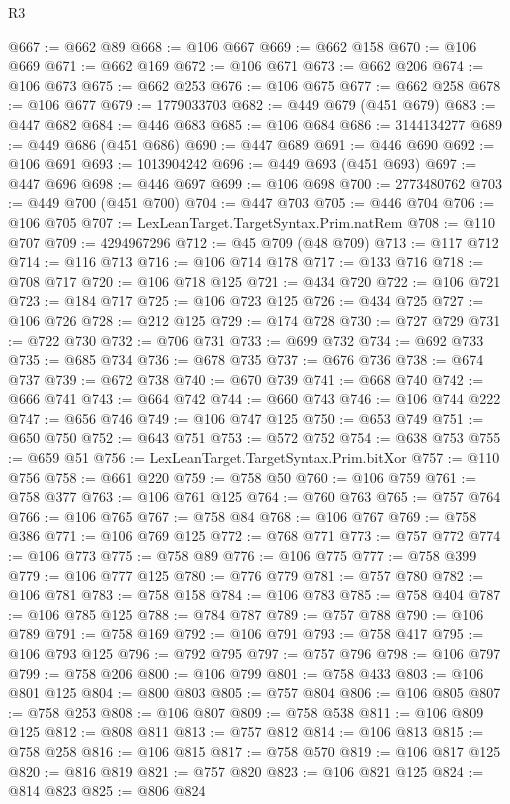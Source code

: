 \begin{lexlean}{R3}
\begin{coremodule}
@667 := @662 @89
@668 := @106 @667
@669 := @662 @158
@670 := @106 @669
@671 := @662 @169
@672 := @106 @671
@673 := @662 @206
@674 := @106 @673
@675 := @662 @253
@676 := @106 @675
@677 := @662 @258
@678 := @106 @677
@679 := 1779033703
@682 := @449 @679 (@451 @679)
@683 := @447 @682
@684 := @446 @683
@685 := @106 @684
@686 := 3144134277
@689 := @449 @686 (@451 @686)
@690 := @447 @689
@691 := @446 @690
@692 := @106 @691
@693 := 1013904242
@696 := @449 @693 (@451 @693)
@697 := @447 @696
@698 := @446 @697
@699 := @106 @698
@700 := 2773480762
@703 := @449 @700 (@451 @700)
@704 := @447 @703
@705 := @446 @704
@706 := @106 @705
@707 := LexLeanTarget.TargetSyntax.Prim.natRem
@708 := @110 @707
@709 := 4294967296
@712 := @45 @709 (@48 @709)
@713 := @117 @712
@714 := @116 @713
@716 := @106 @714 @178
@717 := @133 @716
@718 := @708 @717
@720 := @106 @718 @125
@721 := @434 @720
@722 := @106 @721
@723 := @184 @717
@725 := @106 @723 @125
@726 := @434 @725
@727 := @106 @726
@728 := @212 @125
@729 := @174 @728
@730 := @727 @729
@731 := @722 @730
@732 := @706 @731
@733 := @699 @732
@734 := @692 @733
@735 := @685 @734
@736 := @678 @735
@737 := @676 @736
@738 := @674 @737
@739 := @672 @738
@740 := @670 @739
@741 := @668 @740
@742 := @666 @741
@743 := @664 @742
@744 := @660 @743
@746 := @106 @744 @222
@747 := @656 @746
@749 := @106 @747 @125
@750 := @653 @749
@751 := @650 @750
@752 := @643 @751
@753 := @572 @752
@754 := @638 @753
@755 := @659 @51
@756 := LexLeanTarget.TargetSyntax.Prim.bitXor
@757 := @110 @756
@758 := @661 @220
@759 := @758 @50
@760 := @106 @759
@761 := @758 @377
@763 := @106 @761 @125
@764 := @760 @763
@765 := @757 @764
@766 := @106 @765
@767 := @758 @84
@768 := @106 @767
@769 := @758 @386
@771 := @106 @769 @125
@772 := @768 @771
@773 := @757 @772
@774 := @106 @773
@775 := @758 @89
@776 := @106 @775
@777 := @758 @399
@779 := @106 @777 @125
@780 := @776 @779
@781 := @757 @780
@782 := @106 @781
@783 := @758 @158
@784 := @106 @783
@785 := @758 @404
@787 := @106 @785 @125
@788 := @784 @787
@789 := @757 @788
@790 := @106 @789
@791 := @758 @169
@792 := @106 @791
@793 := @758 @417
@795 := @106 @793 @125
@796 := @792 @795
@797 := @757 @796
@798 := @106 @797
@799 := @758 @206
@800 := @106 @799
@801 := @758 @433
@803 := @106 @801 @125
@804 := @800 @803
@805 := @757 @804
@806 := @106 @805
@807 := @758 @253
@808 := @106 @807
@809 := @758 @538
@811 := @106 @809 @125
@812 := @808 @811
@813 := @757 @812
@814 := @106 @813
@815 := @758 @258
@816 := @106 @815
@817 := @758 @570
@819 := @106 @817 @125
@820 := @816 @819
@821 := @757 @820
@823 := @106 @821 @125
@824 := @814 @823
@825 := @806 @824

\end{coremodule}
\end{lexlean}
